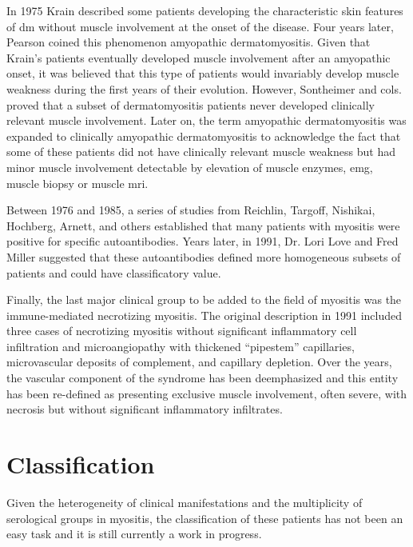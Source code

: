 In 1975 Krain\cite{Krain1975} described some patients developing the characteristic skin features of \gls{dm} without muscle involvement at the onset of the disease. Four years later, Pearson coined this phenomenon amyopathic dermatomyositis.\cite{Pearson1979} Given that Krain’s patients eventually developed muscle involvement after an amyopathic onset, it was believed that this type of patients would invariably develop muscle weakness during the first years of their evolution. However, Sontheimer and cols. proved that a subset of dermatomyositis patients never developed clinically relevant muscle involvement.\cite{Euwer1991} Later on, the term amyopathic dermatomyositis was expanded to clinically amyopathic dermatomyositis to acknowledge the fact that some of these patients did not have clinically relevant muscle weakness but had minor muscle involvement detectable by elevation of muscle enzymes, \gls{emg}, muscle biopsy or muscle \gls{mri}.\cite{Sontheimer2002}

Between 1976 and 1985, a series of studies from Reichlin, Targoff, Nishikai, Hochberg, Arnett, and others established that many patients with myositis were positive for specific autoantibodies.\cite{Nishikai1980,Targoff1985,Reichlin1976,Hochberg1984} Years later, in 1991, Dr. Lori Love and Fred Miller suggested that these autoantibodies defined more homogeneous subsets of patients and could have classificatory value.\cite{Love1991}

Finally, the last major clinical group to be added to the field of myositis was the immune-mediated necrotizing myositis. The original description in 1991\cite{EmslieSmith1991} included three cases of necrotizing myositis without significant inflammatory cell infiltration and microangiopathy with thickened “pipestem” capillaries, microvascular deposits of complement, and capillary depletion. Over the years, the vascular component of the syndrome has been deemphasized and this entity has been re-defined as presenting exclusive muscle involvement, often severe, with necrosis but without significant inflammatory infiltrates.

\section{Classification}

Given the heterogeneity of clinical manifestations and the multiplicity of serological groups in myositis, the classification of these patients has not been an easy task and it is still currently a work in progress.

